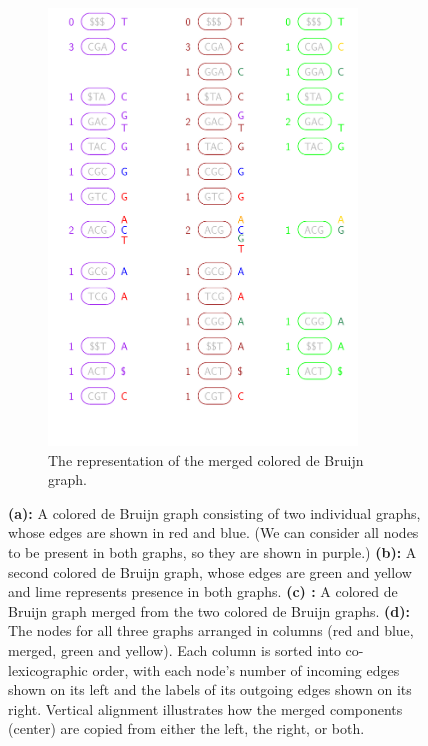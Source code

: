 \begin{figure}[h!]
\begin{subfigure}[c]{0.5\textwidth}
        \includegraphics[width=0.9\textwidth]{newbrownmapping.pdf}
        \caption{The representation of the merged colored de Bruijn graph.}
        \label{fig:g2}
    \end{subfigure}
\caption{{\bf (a):} A colored de Bruijn graph consisting of two individual graphs, whose edges are shown in red and blue.  (We can consider all nodes to be present in both graphs, so they are shown in purple.)  {\bf (b):} A second colored de Bruijn graph, whose edges are green and yellow and lime represents presence in both graphs.  {\bf (c) :} A colored de Bruijn graph merged from the two colored de Bruijn  graphs.  {\bf (d):} The nodes for all three graphs arranged in columns (red and blue, merged, green and yellow). Each column is sorted into co-lexicographic order, with each node's number of incoming edges shown on its left and the labels of its outgoing edges shown on its right.  Vertical alignment illustrates how the merged components (center) are copied from either the left, the right, or both.} 
\label{fig:brown}
\end{figure}



